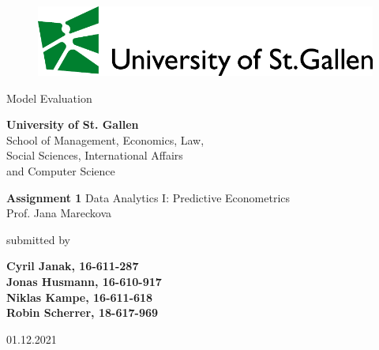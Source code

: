 \begin{center}
\begin{figure}[htb]
  \centering
  \def\svgwidth{450pt}
  \scriptsize{\includegraphics[width=15cm]{rmarkdown/logo-hsg-neu-en.pdf}}
\end{figure}
\end{center}

\medskip
\begin{center}
  \huge{Model Evaluation}
\end{center}

\medskip
\begin{center}
  \normalsize{\textbf{University of St. Gallen}\\
              School of Management, Economics, Law,\\
              Social Sciences, International Affairs \\
              and Computer Science}
\end{center}

\medskip
\begin{center}
\textbf{\Large{Assignment 1}}
\linebreak
\linebreak
\normalsize{Data Analytics I: Predictive Econometrics\\
            Prof. Jana Mareckova}
\end{center}
\medskip
\begin{center}
  submitted by
\end{center}
\medskip
\begin{center}
  \Large{\textbf{Cyril Janak, 16-611-287}}\\
  \Large{\textbf{Jonas Husmann, 16-610-917}}\\
  \Large{\textbf{Niklas Kampe, 16-611-618}}\\
  \Large{\textbf{Robin Scherrer, 18-617-969}}
\end{center}

\vspace*{\fill}
\begin{center}
\large{01.12.2021}
\end{center}